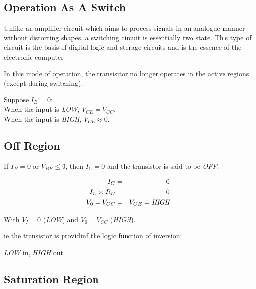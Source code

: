 \documentclass[a4paper,12pt]{article}
\begin{document}
\subsection{Operation As A Switch}

Unlike an amplifier circuit which aims to process signals in
an analogue manner without distorting shapes, a switching circuit is
essentially two state. This type of circuit is the basis of digital
logic and storage circuits and is the essence of the electronic
computer.

In this mode of operation, the transisitor no longer operates
in the active regions (except during switching).

\begin{table}[hbtp]

\begin{circuit}{0}

\end{circuit}

\end{table}


Suppose $I_{B} = 0$: \\

When the input is \emph{LOW}, $V_{CE} = V_{CC}$. \\

When the input is \emph{HIGH}, $V_{CE} \approx 0$. \\

\subsection{Off Region}

If $I_{B} = 0$ or $V_{BE} \leq 0$, then $I_{C} = 0$ and the
transistor is said to be \emph{OFF}.

\begin{eqnarray}
I_{C} & = & 0 \\
I_{C} \times R_{C} & = & 0 \\
V_{0} = V_{CC} & = & V_{CE} = \emph{HIGH}
\end{eqnarray}

With $V_{I} = 0$ (\emph{LOW}) and $V_{0} = V_{CC}$
(\emph{HIGH}).

ie the transistor is providinf the logic function of
inversion:

\emph{LOW} in, \emph{HIGH} out.

\subsection{Saturation Region}
\end{document}
